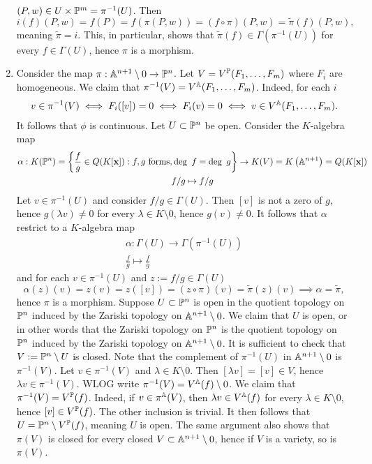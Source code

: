 \begin{example}
\begin{enumerate}
            $(P,w)\in U\times \mathbb{P}^m=\pi^{-1}(U)$. Then 
            $$i(f)(P,w)=f(P)=f(\pi(P,w))=(f\circ \pi)(P,w)=\widetilde{\pi}(f)(P,w),$$
            meaning $\widetilde{\pi} = i$. This, in particular, shows that $\widetilde{\pi}(f)\in \Gamma\left(\pi^{-1}(U)\right)$ for every $f\in \Gamma(U)$, hence $\pi$ is a morphism. 
            \item Consider the map $\pi : \mathbb{A}^{n+1}\setminus 0 \rightarrow \mathbb{P}^n$. Let $V= V^{\mathbb{P}}(F_1,\dots,F_m)$ where $F_i$ are homogeneous. We claim that $\pi^{-1}(V)=V^{\mathbb{A}}(F_1,\dots,F_m)$. Indeed, for each $i$
            \begin{align*}
                v\in \pi^{-1}(V) \iff F_i([v])=0 \iff F_i(v)=0 \iff v\in V^{\mathbb{A}}(F_1,\dots,F_m).
            \end{align*}
            It follows that $\phi$ is continuous. Let $U\subset \mathbb{P}^n$ be open. Consider the $K$-algebra map 
            \begin{gather*}
                \alpha : K(\mathbb{P}^n)=\left\{\frac{f}{g}\in Q(K[\mathbf{x}]): f,g \text{ forms}, \deg\ f = \deg \ g \right\} \rightarrow K(V)=K\left(\mathbb{A}^{n+1}\right) = Q(K[\mathbf{x}])\\
                f/g\mapsto f/g
            \end{gather*}
            Let $v\in \pi^{-1}(U)$ and consider $f/g\in \Gamma(U)$. Then $[v]$ is not a zero of $g$, hence $g(\lambda v)\neq 0$ for every $\lambda \in K\setminus 0$, hence $g(v)\neq 0$. It follows that $\alpha$ restrict to a $K$-algebra map
            \begin{gather*}
                \alpha : \Gamma(U)\rightarrow \Gamma\left( \pi^{-1}(U)\right)\\
                \frac{f}{g}\mapsto \frac{f}{g}
            \end{gather*}
            and for each $v\in \pi^{-1}(U)$ and $z:=f/g\in \Gamma(U)$
            $$\alpha(z)(v)=z(v)=z([v])=(z\circ \pi)(v)=\widetilde{\pi}(z)(v)\implies \alpha = \widetilde{\pi},$$
            hence $\pi$ is a morphism. Suppose $U\subset \mathbb{P}^n$ is open in the quotient topology on $\mathbb{P}^n$ induced by the Zariski topology on $\mathbb{A}^{n+1}\setminus 0$. We claim that $U$ is open, or in other words that the Zariski topology on $\mathbb{P}^n$ is the quotient topology on $\mathbb{P}^n$ induced by the Zariski topology on $\mathbb{A}^{n+1}\setminus0$. It is sufficient to check that $V:= \mathbb{P}^n\setminus U$ is closed. Note that the complement of $\pi^{-1}(U)$ in $\mathbb{A}^{n+1}\setminus 0$ is $\pi^{-1}(V)$. Let $v\in \pi^{-1}(V)$ and $\lambda \in K\setminus 0$. Then $[\lambda v]= [v]\in V$, hence $\lambda v\in \pi^{-1}(V)$. WLOG write $\pi^{-1}(V)=V^{\mathbb{A}}(f)\setminus 0$. We claim that $\pi^{-1}(V)=V^{\mathbb{P}}(f)$. Indeed, if $v\in \pi^{\mathbb{A}}(V)$, then $\lambda v\in V^{\mathbb{A}}(f)$ for every $\lambda \in K\setminus 0$, hence $[v]\in V^{\mathbb{P}}(f)$. The other inclusion is trivial. It then follows that $U= \mathbb{P}^n\setminus V^{\mathbb{P}}(f)$, meaning $U$ is open. The same argument also shows that $\pi(V)$ is closed for every closed $V\subset \mathbb{A}^{n+1}\setminus 0$, hence if $V$ is a variety, so is $\pi(V)$.
        \end{enumerate}
    \end{example}
